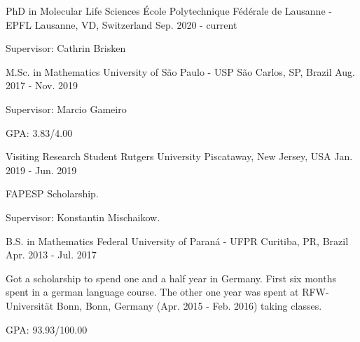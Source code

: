 

\begin{cventries}

  \cventry
    {PhD in Molecular Life Sciences} %
    {École Polytechnique Fédérale de Lausanne - EPFL} %
    {Lausanne, VD, Switzerland} %
    {Sep. 2020 - current}
    {\begin{cvitems}
        \item{Supervisor: Cathrin Brisken}
     \end{cvitems}
    }


  \cventry
    {M.Sc. in Mathematics} %
    {University of São Paulo - USP} %
    {São Carlos, SP, Brazil} %
    {Aug. 2017 - Nov. 2019}
    {
      \begin{cvitems} %
        \item{Supervisor: Marcio Gameiro}
        \item{GPA: 3.83/4.00}
      \end{cvitems}
    }

  \cventry
    {Visiting Research Student}
    {Rutgers University}
    {Piscataway, New Jersey, USA}
    {Jan. 2019 - Jun. 2019}
    {
      \begin{cvitems}
        \item{FAPESP Scholarship.}
        \item{Supervisor: Konstantin Mischaikow.}
      \end{cvitems}
    }

  \cventry
    {B.S. in Mathematics} %
    {Federal University of Paraná - UFPR} %
    {Curitiba, PR, Brazil} %
    {Apr. 2013 - Jul. 2017} %
    {
      \begin{cvitems} %
        \item{Got a scholarship to spend one and a half year in Germany.
              First six months spent in a german language course.
              The other one year was spent at RFW-Universität Bonn, Bonn, Germany
              (Apr. 2015 - Feb. 2016) taking classes.}
        \item{GPA: 93.93/100.00}
      \end{cvitems}
    }

\end{cventries}
